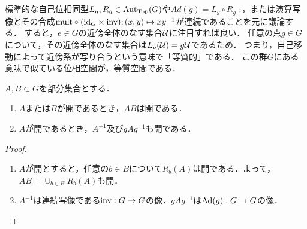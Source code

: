 \documentclass[uplatex,dvipdfmx]{jsreport}
\begin{document}
\begin{tcolorbox}[colframe=ForestGreen, colback=ForestGreen!10!white,breakable,colbacktitle=ForestGreen!40!white,coltitle=black,fonttitle=\bfseries\sffamily,
title=]
    標準的な自己位相同型$L_g,R_g\in\mathrm{Aut}_{\mathrm{Top}}(G)$や$Ad(g)=L_g\circ R_{g^{-1}}$，または演算写像とその合成$\mathrm{mult}\circ(\mathrm{id}_G\times\mathrm{inv});(x,y)\mapsto xy^{-1}$が連続であることを元に議論する．
    すると，$e\in G$の近傍全体のなす集合$\mathcal{U}$に注目すれば良い．
    任意の点$g\in G$について，その近傍全体のなす集合は$L_g(\mathcal{U})=g\mathcal{U}$であるため．
    つまり，自己移動によって近傍系が写り合うという意味で「等質的」である．
    この群$G$にある意味で似ている位相空間が，等質空間である．
\end{tcolorbox}

\begin{lemma}
    $A,B\subset G$を部分集合とする．
    \begin{enumerate}
        \item $A$または$B$が開であるとき，$AB$は開である．
        \item $A$が開であるとき，$A^{-1}$及び$gAg^{-1}$も開である．
    \end{enumerate}
\end{lemma}
\begin{proof}\mbox{}
    \begin{enumerate}
        \item $A$が開とすると，任意の$b\in B$について$R_b(A)$は開である．よって，$AB=\cup_{b\in B}R_b(A)$も開．
        \item $A^{-1}$は連続写像である$\mathrm{inv}:G\to G$の像．$gAg^{-1}$は$\mathrm{Ad}(g):G\to G$の像．
    \end{enumerate}
\end{proof}
\end{document}

